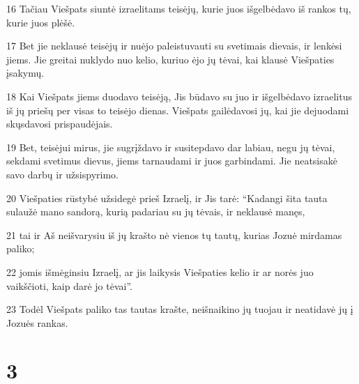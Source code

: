 \par 16 Tačiau Viešpats siuntė izraelitams teisėjų, kurie juos išgelbėdavo iš rankos tų, kurie juos plėšė. 
\par 17 Bet jie neklausė teisėjų ir nuėjo paleistuvauti su svetimais dievais, ir lenkėsi jiems. Jie greitai nuklydo nuo kelio, kuriuo ėjo jų tėvai, kai klausė Viešpaties įsakymų. 
\par 18 Kai Viešpats jiems duodavo teisėją, Jis būdavo su juo ir išgelbėdavo izraelitus iš jų priešų per visas to teisėjo dienas. Viešpats gailėdavosi jų, kai jie dejuodami skųsdavosi prispaudėjais. 
\par 19 Bet, teisėjui mirus, jie sugrįždavo ir susitepdavo dar labiau, negu jų tėvai, sekdami svetimus dievus, jiems tarnaudami ir juos garbindami. Jie neatsisakė savo darbų ir užsispyrimo. 
\par 20 Viešpaties rūstybė užsidegė prieš Izraelį, ir Jis tarė: “Kadangi šita tauta sulaužė mano sandorą, kurią padariau su jų tėvais, ir neklausė manęs, 
\par 21 tai ir Aš neišvarysiu iš jų krašto nė vienos tų tautų, kurias Jozuė mirdamas paliko; 
\par 22 jomis išmėginsiu Izraelį, ar jis laikysis Viešpaties kelio ir ar norės juo vaikščioti, kaip darė jo tėvai”. 
\par 23 Todėl Viešpats paliko tas tautas krašte, neišnaikino jų tuojau ir neatidavė jų į Jozuės rankas.



\chapter{3}


